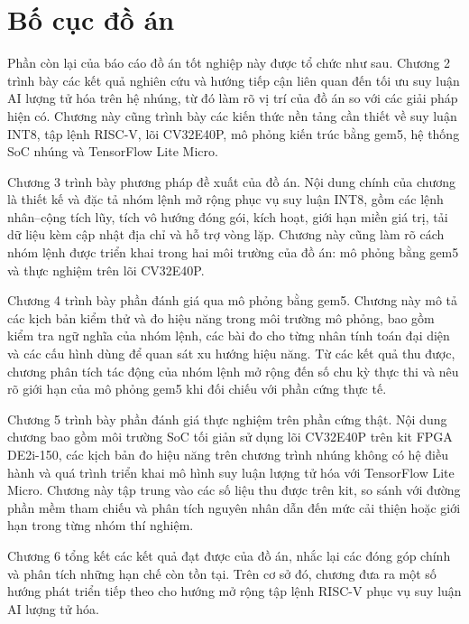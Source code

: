 \documentclass[../DoAn.tex]{subfiles}
\begin{document}
\section{Bố cục đồ án}

Phần còn lại của báo cáo đồ án tốt nghiệp này được tổ chức như sau. Chương 2 trình bày các kết quả nghiên cứu và hướng tiếp cận liên quan đến tối ưu suy luận AI lượng tử hóa trên hệ nhúng, từ đó làm rõ vị trí của đồ án so với các giải pháp hiện có. Chương này cũng trình bày các kiến thức nền tảng cần thiết về suy luận INT8, tập lệnh RISC-V, lõi CV32E40P, mô phỏng kiến trúc bằng gem5, hệ thống SoC nhúng và TensorFlow Lite Micro.

Chương 3 trình bày phương pháp đề xuất của đồ án. Nội dung chính của chương là thiết kế và đặc tả nhóm lệnh mở rộng phục vụ suy luận INT8, gồm các lệnh nhân--cộng tích lũy, tích vô hướng đóng gói, kích hoạt, giới hạn miền giá trị, tải dữ liệu kèm cập nhật địa chỉ và hỗ trợ vòng lặp. Chương này cũng làm rõ cách nhóm lệnh được triển khai trong hai môi trường của đồ án: mô phỏng bằng gem5 và thực nghiệm trên lõi CV32E40P.

Chương 4 trình bày phần đánh giá qua mô phỏng bằng gem5. Chương này mô tả các kịch bản kiểm thử và đo hiệu năng trong môi trường mô phỏng, bao gồm kiểm tra ngữ nghĩa của nhóm lệnh, các bài đo cho từng nhân tính toán đại diện và các cấu hình dùng để quan sát xu hướng hiệu năng. Từ các kết quả thu được, chương phân tích tác động của nhóm lệnh mở rộng đến số chu kỳ thực thi và nêu rõ giới hạn của mô phỏng gem5 khi đối chiếu với phần cứng thực tế.

Chương 5 trình bày phần đánh giá thực nghiệm trên phần cứng thật. Nội dung chương bao gồm môi trường SoC tối giản sử dụng lõi CV32E40P trên kit FPGA DE2i-150, các kịch bản đo hiệu năng trên chương trình nhúng không có hệ điều hành và quá trình triển khai mô hình suy luận lượng tử hóa với TensorFlow Lite Micro. Chương này tập trung vào các số liệu thu được trên kit, so sánh với đường phần mềm tham chiếu và phân tích nguyên nhân dẫn đến mức cải thiện hoặc giới hạn trong từng nhóm thí nghiệm.

Chương 6 tổng kết các kết quả đạt được của đồ án, nhắc lại các đóng góp chính và phân tích những hạn chế còn tồn tại. Trên cơ sở đó, chương đưa ra một số hướng phát triển tiếp theo cho hướng mở rộng tập lệnh RISC-V phục vụ suy luận AI lượng tử hóa.
\end{document}
